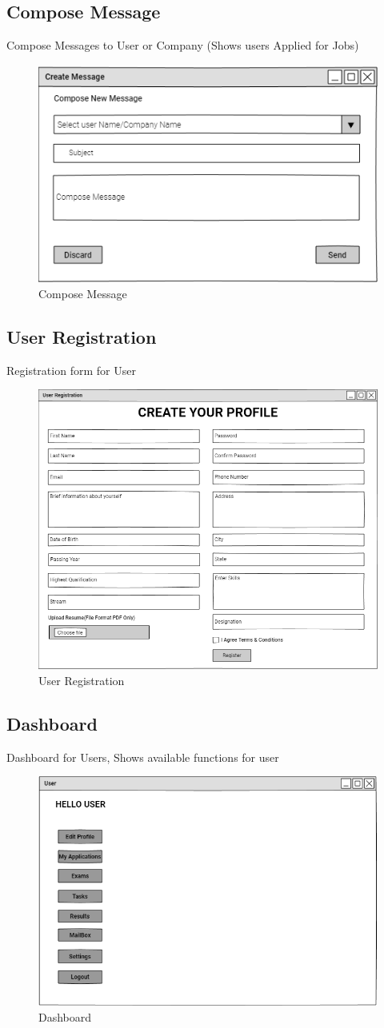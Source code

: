 \documentclass[a4paper,12pt]{report}
\begin{document}
\subsection {Compose Message}
Compose Messages to User or Company (Shows users Applied for Jobs)
\begin{figure}[bph]
	\centering
	\includegraphics[width=.5\linewidth]{img/create_msg}
	\caption{Compose Message}
\end{figure}
\subsection {User Registration}
Registration form for User
\begin{figure}[bph]
	\centering
	\includegraphics[width=.6\linewidth ]{img/user/user_registration}
	\caption{User Registration}
\end{figure}
\pagebreak

\subsection {Dashboard}
Dashboard for Users, Shows available functions for user
\begin{figure}[bph]
	\centering
	\includegraphics[width=.8\linewidth]{img/user/userhompage}
	\caption{Dashboard}
\end{figure}
\end{document}
